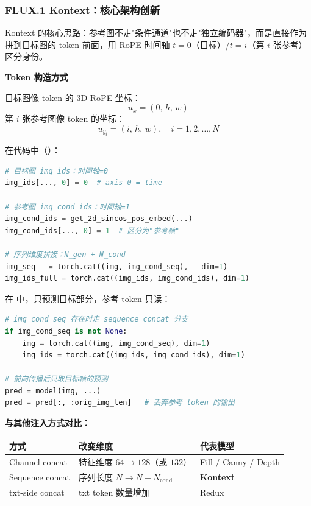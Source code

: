 \subsubsection{FLUX.1 Kontext：核心架构创新}

\begin{intubox}
Kontext 的核心思路：参考图不走"条件通道"也不走"独立编码器"，而是直接作为拼到目标图的 token 前面，用 RoPE 时间轴 $t=0$（目标）/$t=i$（第 $i$ 张参考）区分身份。
\end{intubox}

\textbf{Token 构造方式}

目标图像 token 的 3D RoPE 坐标：
$$u_x = (0,\, h,\, w)$$
第 $i$ 张参考图像 token 的坐标：
$$u_{y_i} = (i,\, h,\, w), \quad i = 1, 2, \ldots, N$$

在代码中（）：
\begin{lstlisting}[language=Python]
# 目标图 img_ids：时间轴=0
img_ids[..., 0] = 0  # axis 0 = time

# 参考图 img_cond_ids：时间轴=1
img_cond_ids = get_2d_sincos_pos_embed(...)
img_cond_ids[..., 0] = 1  # 区分为"参考帧"

# 序列维度拼接：N_gen + N_cond
img_seq   = torch.cat((img, img_cond_seq),   dim=1)
img_ids_full = torch.cat((img_ids, img_cond_ids), dim=1)
\end{lstlisting}

在  中，只预测目标部分，参考 token 只读：
\begin{lstlisting}[language=Python]
# img_cond_seq 存在时走 sequence concat 分支
if img_cond_seq is not None:
    img = torch.cat((img, img_cond_seq), dim=1)
    img_ids = torch.cat((img_ids, img_cond_ids), dim=1)

# 前向传播后只取目标帧的预测
pred = model(img, ...)
pred = pred[:, :orig_img_len]   # 丢弃参考 token 的输出
\end{lstlisting}

\textbf{与其他注入方式对比：}

\begin{center}
\begin{tabular}{lll}
\toprule
\textbf{方式} & \textbf{改变维度} & \textbf{代表模型} \\
\midrule
Channel concat & 特征维度 $64 \to 128$（或 $132$） & Fill / Canny / Depth \\
Sequence concat & 序列长度 $N \to N + N_\text{cond}$ & \textbf{Kontext} \\
txt-side concat & txt token 数量增加 & Redux \\
\bottomrule
\end{tabular}
\end{center}

